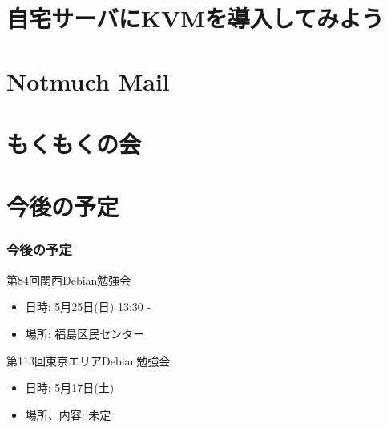 \documentclass[cjk,dvipdfmx,10pt,compress,%
hyperref={bookmarks=true,bookmarksnumbered=true,bookmarksopen=false,%
colorlinks=false,%
pdftitle={第 82 回 関西 Debian 勉強会},%
pdfauthor={倉敷・のがた・佐々木・かわだ・八津尾},%
pdfsubject={資料},%
}]{beamer}
\begin{document}

\section{自宅サーバにKVMを導入してみよう}


\section{Notmuch Mail}


\section{もくもくの会}


\section{今後の予定}
\begin{frame}[fragile]
\frametitle{今後の予定}

\begin{block}{第84回関西Debian勉強会}
  \begin{itemize}
  \item 日時: 5月25日(日) 13:30 -
  \item 場所: 福島区民センター
  \end{itemize}
\end{block}

\begin{block}{第113回東京エリアDebian勉強会}
  \begin{itemize}
  \item 日時: 5月17日(土)
  \item 場所、内容: 未定
  \end{itemize}
\end{block}

\end{frame}

\takahashi[50]{  }
\end{document}
